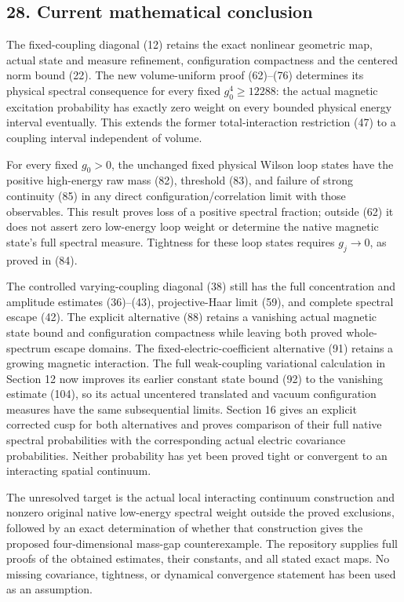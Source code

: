 \documentclass[
  11pt,
]{article}
\begin{document}
\subsection{28. Current mathematical
conclusion}\label{current-mathematical-conclusion}

The fixed-coupling diagonal (12) retains the exact nonlinear geometric
map, actual state and measure refinement, configuration compactness and
the centered norm bound (22). The new volume-uniform proof (62)--(76)
determines its physical spectral consequence for every fixed
\(g_0^4\ge12288\): the actual magnetic excitation probability has
exactly zero weight on every bounded physical energy interval
eventually. This extends the former total-interaction restriction (47)
to a coupling interval independent of volume.

For every fixed \(g_0>0\), the unchanged fixed physical Wilson loop
states have the positive high-energy raw mass (82), threshold (83), and
failure of strong continuity (85) in any direct
configuration/correlation limit with those observables. This result
proves loss of a positive spectral fraction; outside (62) it does not
assert zero low-energy loop weight or determine the native magnetic
state's full spectral measure. Tightness for these loop states requires
\(g_j\to0\), as proved in (84).

The controlled varying-coupling diagonal (38) still has the full
concentration and amplitude estimates (36)--(43), projective-Haar limit
(59), and complete spectral escape (42). The explicit alternative (88)
retains a vanishing actual magnetic state bound and configuration
compactness while leaving both proved whole-spectrum escape domains. The
fixed-electric-coefficient alternative (91) retains a growing magnetic
interaction. The full weak-coupling variational calculation in Section
12 now improves its earlier constant state bound (92) to the vanishing
estimate (104), so its actual uncentered translated and vacuum
configuration measures have the same subsequential limits. Section 16
gives an explicit corrected cusp for both alternatives and proves
comparison of their full native spectral probabilities with the
corresponding actual electric covariance probabilities. Neither
probability has yet been proved tight or convergent to an interacting
spatial continuum.

The unresolved target is the actual local interacting continuum
construction and nonzero original native low-energy spectral weight
outside the proved exclusions, followed by an exact determination of
whether that construction gives the proposed four-dimensional mass-gap
counterexample. The repository supplies full proofs of the obtained
estimates, their constants, and all stated exact maps. No missing
covariance, tightness, or dynamical convergence statement has been used
as an assumption.
\end{document}
